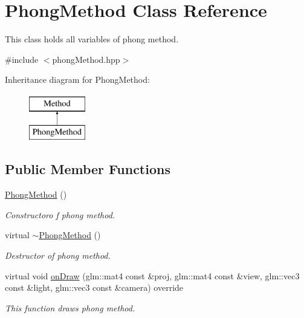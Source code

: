 \hypertarget{classPhongMethod}{}\section{Phong\+Method Class Reference}
\label{classPhongMethod}


This class holds all variables of phong method.  




{\ttfamily \#include $<$phong\+Method.\+hpp$>$}

Inheritance diagram for Phong\+Method\+:\begin{figure}[H]
\begin{center}
\leavevmode
\includegraphics[height=2.000000cm]{classPhongMethod}
\end{center}
\end{figure}
\subsection*{Public Member Functions}
\begin{DoxyCompactItemize}
\item 
\hyperlink{group__cpu__side_ga609f942b12f18a74313937d4aa071c0b}{Phong\+Method} ()
\begin{DoxyCompactList}\small\item\em Constructoro f phong method. \end{DoxyCompactList}\item 
virtual \hyperlink{group__cpu__side_ga64fbf177f01aca9027d510611a2dad73}{$\sim$\+Phong\+Method} ()
\begin{DoxyCompactList}\small\item\em Destructor of phong method. \end{DoxyCompactList}\item 
virtual void \hyperlink{group__cpu__side_ga100e32901442800e1c155b5ce089f7c5}{on\+Draw} (glm\+::mat4 const \&proj, glm\+::mat4 const \&view, glm\+::vec3 const \&light, glm\+::vec3 const \&camera) override
\begin{DoxyCompactList}\small\item\em This function draws phong method. \end{DoxyCompactList}\end{DoxyCompactItemize}
